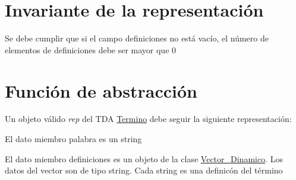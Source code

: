 \hypertarget{repTermino_invTermino}{}\section{Invariante de la representación}\label{repTermino_invTermino}
Se debe cumplir que si el campo definiciones no está vacío, el número de elementos de definiciones debe ser mayor que 0 \hypertarget{repTermino_faTermino}{}\section{Función de abstracción}\label{repTermino_faTermino}
Un objeto válido {\itshape rep} del T\+DA \mbox{\hyperlink{classTermino}{Termino}} debe seguir la siguiente representación\+:
\begin{DoxyItemize}
\item El dato miembro palabra es un string
\item El dato miembro definiciones es un objeto de la clase \mbox{\hyperlink{classVector__Dinamico}{Vector\+\_\+\+Dinamico}}. Los datos del vector son de tipo string. Cada string es una definicón del término 
\end{DoxyItemize}